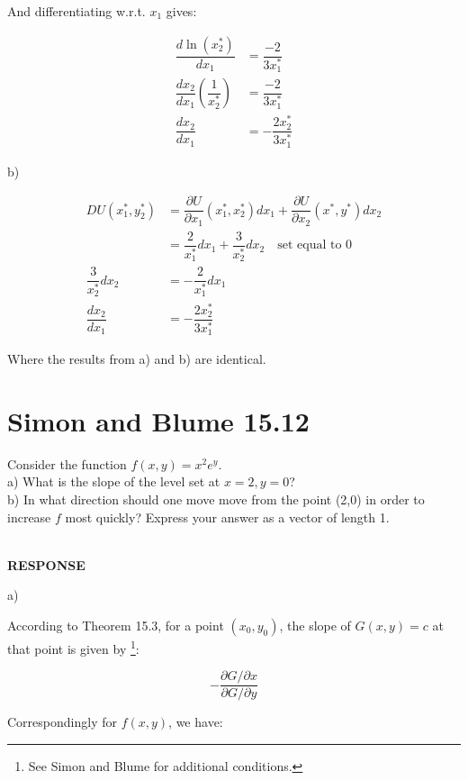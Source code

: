 \documentclass{article}
\begin{document}
And differentiating w.r.t. $x_1$ gives:

\begingroup
\addtolength{\jot}{1em} %
\begin{align*}
    \dfrac{d\ln(x_2^*)}{dx_1} &=\dfrac{-2}{3x_1^*}  \\
    \dfrac{dx_2}{dx_1} \left( \dfrac{1}{x_2^*} \right) &=\dfrac{-2}{3x_1^*} \\
    \dfrac{dx_2}{dx_1} &=-\dfrac{2x_2^*}{3x_1^*} 
\end{align*}
\endgroup

b)

\begingroup
\addtolength{\jot}{1em} %
\begin{align*}
     DU(x_1^*,y_2^*) &= \dfrac{\partial U}{\partial x_1} (x_1^*,x_2^*)dx_1 + \dfrac{\partial U}{\partial x_2} (x^*,y^*)dx_2 \\
     &= \dfrac{2}{x_1^*}dx_1 + \dfrac{3}{x_2^*}dx_2    \quad \text{set equal to 0} \\
    \dfrac{3}{x_2^*}dx_2  &= -\dfrac{2}{x_1^*}dx_1 \\
    \dfrac{dx_2}{dx_1}  &= -\dfrac{2x_2^*}{3x_1^*}
\end{align*}
\endgroup

Where the results from a) and b) are identical.


\pagebreak
\section{Simon and Blume 15.12}
\colorbox{gray!30}{
\begin{minipage}{\textwidth}
Consider the function $f(x,y) = x^2 e^y$. \\
a) What is the slope of the level set at $x=2,y=0$?\\
b) In what direction should one move move from the point (2,0) in order to increase $f$ most quickly? Express your answer as a vector of length 1. 
\end{minipage}
} \\

\textbf{RESPONSE}

a) 

According to Theorem 15.3, for a point $(x_0,y_0)$, the slope of $G(x,y)=c$ at that point is given by \footnote{See Simon and Blume for additional conditions.}: 

$$ - \frac{\partial G / \partial x}{\partial G/\partial y} $$ 

Correspondingly for $f(x,y)$, we have: 
\end{document}
